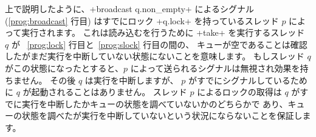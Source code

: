 上で説明したように、\ml+broadcast q.non_empty+ によるシグナル
(\ref{prog:broadcast} 行目) はすでにロック \ml+q.lock+ を持っているスレッド
$p$ によって実行されます。
これは読み込むを行うために \ml+take+ を実行するスレッド $q$ が
~\ref{prog:lock} 行目と~\ref{prog:slock} 行目の間の、
キューが空であることは確認したがまだ実行を中断していない状態にないことを意味します。
もしスレッド $q$ がこの状態になったとすると、$p$ によって送られるシグナルは無視され効果を持ちません。
その後 $q$ は実行を中断しますが、 $p$ がすでにシグナルしているために $q$ が起動されることはありません。
スレッド $p$ によるロックの取得は $q$ がすでに実行を中断したかキューの状態を調べていないかのどちらかで
あり、キューの状態を調べたが実行を中断していないという状況にならないことを保証します。

